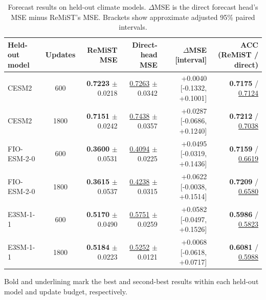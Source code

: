 \begin{table}[!t]
\centering\footnotesize
\caption{Forecast results on held-out climate models. $\Delta$MSE is the direct forecast head's MSE minus ReMiST's MSE. Brackets show approximate adjusted 95\% paired intervals.}
\label{tab:generalization}
\begin{tabular}{lcrrrr}
\toprule
Held-out model & Updates & ReMiST MSE & Direct-head MSE & $\Delta$MSE [interval] & ACC (ReMiST / direct) \\
\midrule
CESM2 & 600 & \textbf{0.7223} $\pm$ 0.0218 & \underline{0.7263} $\pm$ 0.0342 & +0.0040 [-0.1332, +0.1001] & \textbf{0.7175} / \underline{0.7124} \\
CESM2 & 1800 & \textbf{0.7151} $\pm$ 0.0242 & \underline{0.7438} $\pm$ 0.0357 & +0.0287 [-0.0686, +0.1240] & \textbf{0.7212} / \underline{0.7038} \\
FIO-ESM-2-0 & 600 & \textbf{0.3600} $\pm$ 0.0531 & \underline{0.4094} $\pm$ 0.0225 & +0.0495 [-0.0319, +0.1436] & \textbf{0.7159} / \underline{0.6619} \\
FIO-ESM-2-0 & 1800 & \textbf{0.3615} $\pm$ 0.0537 & \underline{0.4238} $\pm$ 0.0315 & +0.0622 [-0.0038, +0.1514] & \textbf{0.7209} / \underline{0.6580} \\
E3SM-1-1 & 600 & \textbf{0.5170} $\pm$ 0.0490 & \underline{0.5751} $\pm$ 0.0259 & +0.0582 [-0.0497, +0.1526] & \textbf{0.5986} / \underline{0.5823} \\
E3SM-1-1 & 1800 & \textbf{0.5184} $\pm$ 0.0223 & \underline{0.5252} $\pm$ 0.0121 & +0.0068 [-0.0618, +0.0717] & \textbf{0.6081} / \underline{0.5988} \\
\bottomrule
\end{tabular}
\par\smallskip\begin{minipage}{\textwidth}\footnotesize Bold and underlining mark the best and second-best results within each held-out model and update budget, respectively.\end{minipage}
\end{table}
